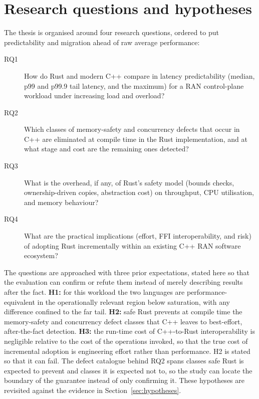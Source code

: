 \documentclass[english,twoside,openright,a4paper,censored,csm,software-track-2020]{HYthesisML}
\begin{document}
\section{Research questions and hypotheses}\label{sec:rqs}
The thesis is organised around four research questions, ordered to put predictability and
migration ahead of raw average performance:

\begin{description}
  \item[RQ1] How do Rust and modern C++ compare in latency predictability (median, p99
        and p99.9 tail latency, and the maximum) for a RAN control-plane workload under
        increasing load and overload?
  \item[RQ2] Which classes of memory-safety and concurrency defects that occur in C++ are
        eliminated at compile time in the Rust implementation, and at what stage and cost
        are the remaining ones detected?
  \item[RQ3] What is the overhead, if any, of Rust's safety model (bounds checks,
        ownership-driven copies, abstraction cost) on throughput, CPU utilisation, and
        memory behaviour?
  \item[RQ4] What are the practical implications (effort, FFI interoperability, and risk)
        of adopting Rust incrementally within an existing C++ RAN software ecosystem?
\end{description}

The questions are approached with three prior expectations, stated here so that the evaluation
can confirm or refute them instead of merely describing results after the fact. \textbf{H1:} for
this workload the two languages are performance-equivalent in the operationally relevant region
below saturation, with any difference confined to the far tail. \textbf{H2:} safe Rust prevents
at compile time the memory-safety and concurrency defect classes that C++ leaves to
best-effort, after-the-fact detection. \textbf{H3:} the run-time cost of C++-to-Rust
interoperability is negligible relative to the cost of the operations invoked, so that the true
cost of incremental adoption is engineering effort rather than performance. H2 is stated so that
it can fail. The defect catalogue behind RQ2 spans classes safe Rust is expected to prevent and
classes it is expected not to, so the study can locate the boundary of the guarantee instead of
only confirming it. These hypotheses are revisited against the evidence in
Section~\ref{sec:hypotheses}.
\end{document}
